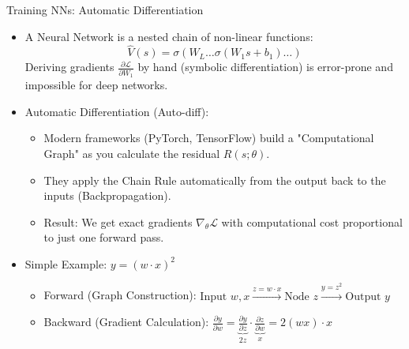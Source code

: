 \documentclass[aspectratio=169]{beamer}
\newcommand{\1}{\mathbf{1}}
\begin{document}
\begin{frame}{Training NNs: Automatic Differentiation}
    \small
    \begin{itemize}
        \item A Neural Network is a nested chain of non-linear functions:
        $$ \hat{V}(s) = \sigma(W_L \dots \sigma(W_1 s + b_1) \dots ) $$
        Deriving gradients $\frac{\partial \mathcal{L}}{\partial W_1}$ by hand (symbolic differentiation) is error-prone and impossible for deep networks.
        
        \item Automatic Differentiation (Auto-diff):
        \begin{itemize}
            \item Modern frameworks (PyTorch, TensorFlow) build a "Computational Graph" as you calculate the residual $R(s; \theta)$.
            \item They apply the Chain Rule automatically from the output back to the inputs (Backpropagation).
            \item Result: We get exact gradients $\nabla_\theta \mathcal{L}$ with computational cost proportional to just one forward pass.
        \end{itemize}

        \item Simple Example: $y = (w \cdot x)^2$
        \begin{itemize}
            \item Forward (Graph Construction): 
            $ \text{Input } w, x \xrightarrow{z = w \cdot x} \text{Node } z \xrightarrow{y = z^2} \text{Output } y $
            \item Backward (Gradient Calculation):
            $ \frac{\partial y}{\partial w} = \underbrace{\frac{\partial y}{\partial z}}_{2z} \cdot \underbrace{\frac{\partial z}{\partial w}}_{x} = 2(wx) \cdot x $
        \end{itemize}
    \end{itemize}
\end{frame}
\end{document}
